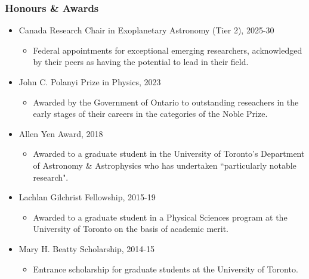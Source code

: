 \documentclass[12pt]{article}
\begin{document}
\subsubsection*{Honours \& Awards}
\begin{itemize}[noitemsep]
\item Canada Research Chair in Exoplanetary Astronomy (Tier 2), 2025-30
\begin{itemize}
\item Federal appointments for exceptional emerging researchers, acknowledged by their peers as having the potential to lead in their field.
\end{itemize}
\item John C. Polanyi Prize in Physics, 2023
\begin{itemize}
\item Awarded by the Government of Ontario to outstanding reseachers in the early stages of their careers in the categories of the Noble Prize.  
\end{itemize}
\item Allen Yen Award, 2018
\begin{itemize}
\item Awarded to a graduate student in the University of Toronto's Department of Astronomy \& Astrophysics who has undertaken ``particularly notable research".
\end{itemize}
\item Lachlan Gilchrist Fellowship, 2015-19
\begin{itemize}
\item Awarded to a graduate student in a Physical Sciences program at the University of Toronto on the basis of academic merit.
\end{itemize}
\item Mary H. Beatty Scholarship, 2014-15 
\begin{itemize}
\item Entrance scholarship for graduate students at the University of Toronto.
\end{itemize}
\end{itemize}
\end{document}
